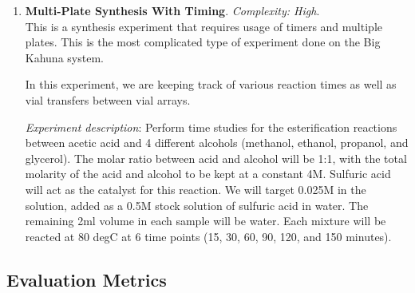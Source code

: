 \documentclass[sn-nature, twocolumn]{sn-jnl}%
\theoremstyle{thmstyleone}%
\theoremstyle{thmstyletwo}%
\theoremstyle{thmstylethree}%
\begin{document}
\begin{enumerate}
    \textit{Experiment description}: Perform esterification reactions between an acid and an alcohol using the liquid catalyst sulfuric acid.  I would like to use the following alcohols: methanol, ethanol, propanol, and glycerol.  I have three acids:  acetic acid, propanoic acid, and benzoic acid.  Acetic acid should be combined with all four alcohols, but benzoic acid and propanoic acid should only be combined with methanol and ethanol.  I would like the molar ratio between the alcohol and acid to be examined at 0.5, 1.0 and 2.0, with the total Molarity of the acid and alcohol to be kept constant at 4 M.  The liquid catalyst should be set to 0.025 M, added as a 0.5M solution of sulfuric acid in water.  The remaining 2ml volume should be water.  After the solutions are prepared, they should be heated to 80 deg for 30 mins before cooling completely to 25C.  Once cooled, a portion of the sample can be diluted by a DF of 10 and transferred to HPLC vials (1mL total volume).  The HPLC samples should be vortexed for 20 minutes after being prepared. \\
    
    \item \textbf{Multi-Plate Synthesis With Timing}. \textit{Complexity: High}. \\
    This is a synthesis experiment that requires usage of timers and multiple plates. This is the most complicated type of experiment done on the Big Kahuna system.  

    In this experiment, we are keeping track of various reaction times as well as vial transfers between vial arrays.  

    \textit{Experiment description}: Perform time studies for the esterification reactions between acetic acid and 4 different alcohols (methanol, ethanol, propanol, and glycerol).  The molar ratio between acid and alcohol will be 1:1, with the total molarity of the acid and alcohol to be kept at a constant 4M. Sulfuric acid will act as the catalyst for this reaction.  We will target 0.025M in the solution, added as a 0.5M stock solution of sulfuric acid in water.  The remaining 2ml volume in each sample will be water.  Each mixture will be reacted at 80 degC at 6 time points (15, 30, 60, 90, 120, and 150 minutes).   
    
\end{enumerate}


\subsection{Evaluation Metrics}
\end{document}
